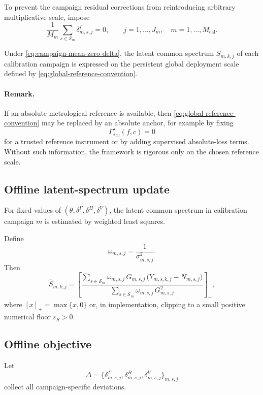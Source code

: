 To prevent the campaign residual corrections from reintroducing arbitrary
multiplicative scale, impose
\begin{equation}
\frac{1}{M_m}
\sum_{s\in\mathcal S_m}
\delta^\Gamma_{m,s,j}
=
0,
\qquad
j=1,\dots,J_m,
\quad
m=1,\dots,M_{\mathrm{cal}}.
\label{eq:campaign-mean-zero-delta}
\end{equation}

Under \eqref{eq:campaign-mean-zero-delta}, the latent common spectrum
$S_{m,k,j}$ of each calibration campaign is expressed on the persistent
global deployment scale defined by
\eqref{eq:global-reference-convention}.

\paragraph{Remark.}
If an absolute metrological reference is available, then
\eqref{eq:global-reference-convention} may be replaced by an absolute anchor,
for example by fixing
\[
\Gamma_{s_{\mathrm{ref}}}^\star(f,c)=0
\]
for a trusted reference instrument or by adding supervised absolute-loss
terms. Without such information, the framework is rigorous only on the chosen
reference scale.

\subsection{Offline latent-spectrum update}

For fixed values of $(\theta,\delta^\Gamma,\delta^H,\delta^V)$, the latent
common spectrum in calibration campaign $m$ is estimated by weighted least
squares.

Define
\[
\omega_{m,s,j}
=
\frac{1}{\sigma_{m,s,j}^2}.
\]
Then
\begin{equation}
\widehat S_{m,k,j}
=
\left[
\frac{
\sum_{s\in\mathcal S_m}
\omega_{m,s,j}\,G_{m,s,j}\,
\bigl(
Y_{m,s,k,j}-N_{m,s,j}
\bigr)
}{
\sum_{s\in\mathcal S_m}
\omega_{m,s,j}\,G_{m,s,j}^2
}
\right]_+,
\label{eq:latent-update}
\end{equation}
where $[x]_+=\max\{x,0\}$ or, in implementation, clipping to a small positive
numerical floor $\varepsilon_S>0$.

\subsection{Offline objective}

Let
\[
\Delta
=
\bigl\{
\delta^\Gamma_{m,s,j},
\delta^H_{m,s,j},
\delta^V_{m,s,j}
\bigr\}_{m,s,j}
\]
collect all campaign-specific deviations.

